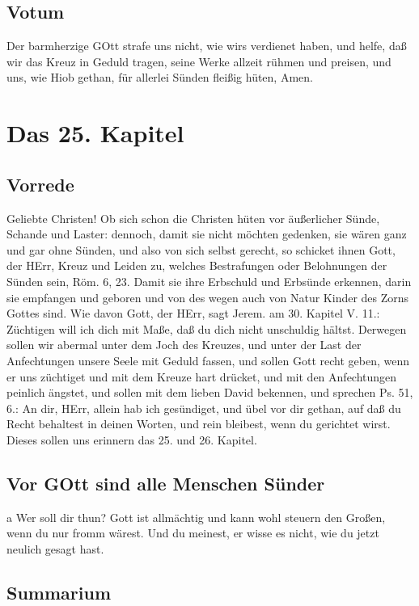 \section{Votum}

Der barmherzige GOtt strafe uns nicht, wie wirs verdienet haben, und helfe, daß wir das Kreuz in Geduld tragen, seine Werke allzeit rühmen und preisen, und uns, wie Hiob gethan, für allerlei Sünden fleißig hüten, Amen.

\chapter{Das 25. Kapitel}

\section{Vorrede}

Geliebte Christen! Ob sich schon die Christen hüten vor äußerlicher Sünde, Schande und Laster: dennoch, damit sie nicht möchten gedenken, sie wären ganz und gar ohne Sünden, und also von sich selbst gerecht, so schicket ihnen Gott, der HErr, Kreuz und Leiden zu, welches Bestrafungen oder Belohnungen der Sünden sein, Röm. 6, 23. Damit sie ihre Erbschuld und Erbsünde erkennen, darin sie empfangen und geboren und von des wegen auch von Natur Kinder des Zorns Gottes sind. Wie davon Gott, der HErr, sagt Jerem. am 30. Kapitel V. 11.: Züchtigen will ich dich mit Maße, daß du dich nicht unschuldig hältst. Derwegen sollen wir abermal unter dem Joch des Kreuzes, und unter der Last der Anfechtungen unsere Seele mit Geduld fassen, und sollen Gott recht geben, wenn er uns züchtiget und mit dem Kreuze hart drücket, und mit den Anfechtungen peinlich ängstet, und sollen mit dem lieben David bekennen, und sprechen Ps. 51, 6.: An dir, HErr, allein hab ich gesündiget, und übel vor dir gethan, auf daß du Recht behaltest in deinen Worten, und rein bleibest, wenn du gerichtet wirst. Dieses sollen uns erinnern das 25. und 26. Kapitel.

\section{Vor GOtt sind alle Menschen Sünder}

a Wer soll dir thun? Gott ist allmächtig und kann wohl steuern den Großen, wenn du nur fromm wärest. Und du meinest, er wisse es nicht, wie du jetzt neulich gesagt hast.

\section{Summarium}

